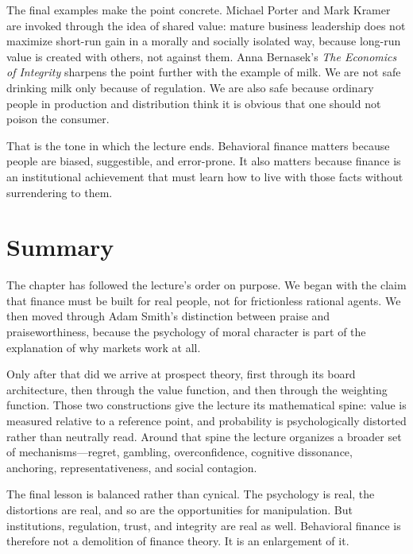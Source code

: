 The final examples make the point concrete. Michael Porter and Mark Kramer are invoked through the idea of shared value: mature business leadership does not maximize short-run gain in a morally and socially isolated way, because long-run value is created with others, not against them. Anna Bernasek's \emph{The Economics of Integrity} sharpens the point further with the example of milk. We are not safe drinking milk only because of regulation. We are also safe because ordinary people in production and distribution think it is obvious that one should not poison the consumer.

That is the tone in which the lecture ends. Behavioral finance matters because people are biased, suggestible, and error-prone. It also matters because finance is an institutional achievement that must learn how to live with those facts without surrendering to them.

\section{Summary}

The chapter has followed the lecture's order on purpose. We began with the claim that finance must be built for real people, not for frictionless rational agents. We then moved through Adam Smith's distinction between praise and praiseworthiness, because the psychology of moral character is part of the explanation of why markets work at all.

Only after that did we arrive at prospect theory, first through its board architecture, then through the value function, and then through the weighting function. Those two constructions give the lecture its mathematical spine: value is measured relative to a reference point, and probability is psychologically distorted rather than neutrally read. Around that spine the lecture organizes a broader set of mechanisms---regret, gambling, overconfidence, cognitive dissonance, anchoring, representativeness, and social contagion.

The final lesson is balanced rather than cynical. The psychology is real, the distortions are real, and so are the opportunities for manipulation. But institutions, regulation, trust, and integrity are real as well. Behavioral finance is therefore not a demolition of finance theory. It is an enlargement of it.